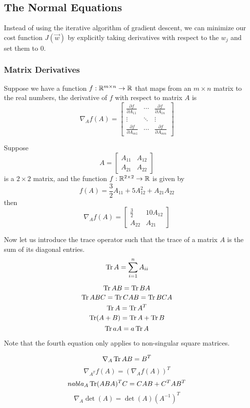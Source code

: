 \documentclass[12pt]{scrartcl}
\begin{document}
\subsection{The Normal Equations}
Instead of using the iterative algorithm of gradient descent, we can minimize our cost function $J(\vec{w})$ by explicitly taking derivatives with respect to the $w_j$ and set them to 0.
\subsubsection{Matrix Derivatives}
Suppose we have a function $f: \mathbb R^{m \times n} \to \mathbb R$ that maps from an $m \times n$ matrix to the real numbers, the derivative of $f$ with respect to matrix $A$ is 
$$\nabla_A f(A) = \begin{bmatrix}
    \frac{\partial f}{\partial A_{11}} & \cdots & \frac{\partial f}{\partial A_{1n}}\\
    \vdots & \ddots & \vdots\\
    \frac{\partial f}{\partial A_{m1}} & \cdots & \frac{\partial f}{\partial A_{mn}}
\end{bmatrix}$$
\begin{example}
    Suppose $$A = \begin{bmatrix}
        A_{11} & A_{12}\\
        A_{21} & A_{22}
    \end{bmatrix}$$ is a $2 \times 2$ matrix, and the function $f: \mathbb R ^{2 \times 2} \to \mathbb R$ is given by 
    \[f(A) = \frac{3}{2}A_{11} + 5A_{12}^2 + A_{21}A_{22}\]
    then 
$$\nabla_A f(A) = \begin{bmatrix}
    \frac{3}{2} & 10A_{12}\\
    A_{22} & A_{21}
\end{bmatrix}$$
\end{example}

Now let us introduce the trace operator such that the trace of a matrix $A$ is the sum of its diagonal entries.
\[\operatorname{Tr} A = \sum_{i=1}^n A_{ii}\]
\begin{lemma}
    \[\operatorname{Tr} AB = \operatorname{Tr} BA\]
    \[\operatorname{Tr} ABC = \operatorname{Tr} CAB = \operatorname{Tr} BCA\]
    \[\operatorname{Tr} A = \operatorname{Tr} A^T\]
    \[\operatorname{Tr}(A + B) = \operatorname{Tr} A + \operatorname{Tr} B\]
    \[\operatorname{Tr} a A = a \operatorname{Tr} A\]
\end{lemma}
Note that the fourth equation only applies to non-singular square matrices.
\begin{lemma}
\[\nabla_A \operatorname{Tr} AB = B^T\]
\[\nabla_{A^T}f(A) = (\nabla_A f(A))^T\]
\[nabla_A \operatorname{Tr} (ABA)^TC = CAB + C^TAB^T\]
\[\nabla_A \det(A) = \det(A)(A^{-1})^T\]
\end{lemma}
\end{document}
